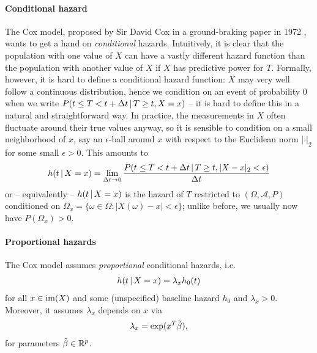 \paragraph{Conditional hazard}
The Cox model, proposed by Sir David Cox in a ground-braking paper in \num{1972} \cite{cox72}, wants 
to get a hand on \textit{conditional} hazards.
Intuitively, it is clear that the population with one value of $X$ can have a vastly different 
hazard function than the population with another value of $X$ if $X$ has predictive power for $T$.
Formally, however, it is hard to define a conditional hazard function: $X$ may very well 
follow a continuous distribution, hence we condition on an event of probability $0$ when we write 
$P(t \leq T < t + \Delta t \,|\, T \geq t, X = x)$ -- it is hard to define this in a natural
and straightforward way. In practice, the measurements in $X$ often fluctuate around their true 
values anyway, so it is sensible to condition on a small neighborhood of $x$, say an $\epsilon$-ball 
around $x$ with respect to the Euclidean norm $|\cdot|_2$ for some small $\epsilon > 0$. This 
amounts to
\begin{align}
    h(t \,|\, X = x) = \lim_{\Delta t \to 0} \frac{P(t \leq T < t + \Delta t \,|\, T \geq t, 
    |X - x|_2 < \epsilon)}{\Delta t}
\end{align}
or -- equivalently -- $h(t \,|\, X = x)$ is the hazard of $T$ restricted to $(\Omega, \mathcal{A}, 
P)$ conditioned on $\Omega_x = \{ \omega \in \Omega: |X(\omega) - x| < \epsilon \}$; unlike before, 
we usually now have $P(\Omega_x) > 0$.

\paragraph{Proportional hazards} The Cox model assumes \textit{proportional} conditional hazards, 
i.e. 
\begin{align}
    h(t \,|\, X = x) = \lambda_x h_0(t) 
\end{align}
for all $x \in \mathrm{im}(X)$ and some (unspecified) baseline hazard $h_0$ and $\lambda_x > 0$. 
Moreover, it assumes $\lambda_x$ depends on $x$ via 
\begin{align}\label{eq:cox-proportional-factor}
    \lambda_x = \exp(x^T \tilde{\beta}),
\end{align}
for parameters $\tilde{\beta} \in \mathbb{R}^p$.

